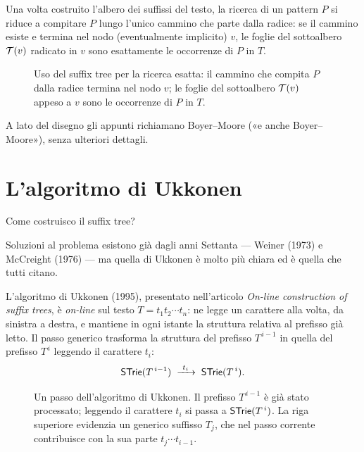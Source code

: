 Una volta costruito l'albero dei suffissi del testo, la ricerca di un pattern $P$ si riduce a
compitare $P$ lungo l'unico cammino che parte dalla radice: se il cammino esiste e termina
nel nodo (eventualmente implicito) $v$, le foglie del sottoalbero $\mathcal{T}(v)$ radicato in
$v$ sono esattamente le occorrenze di $P$ in $T$.

\begin{figure}[H]
\centering

\caption{Uso del suffix tree per la ricerca esatta: il cammino che compita $P$ dalla radice
termina nel nodo $v$; le foglie del sottoalbero $\mathcal{T}(v)$ appeso a $v$ sono le occorrenze
di $P$ in $T$.}
\label{fig:suffix-tree-ricerca-montagna}
\end{figure}

\begin{osservazione}
A lato del disegno gli appunti richiamano Boyer--Moore («e anche Boyer--Moore»), senza
ulteriori dettagli.
\end{osservazione}

\section{L'algoritmo di Ukkonen}

\begin{domanda}
Come costruisco il suffix tree?
\end{domanda}

\begin{osservazione}
Soluzioni al problema esistono già dagli anni Settanta --- Weiner (1973) e McCreight (1976)
--- ma quella di Ukkonen è molto più chiara ed è quella che tutti citano.
\end{osservazione}

L'algoritmo di Ukkonen (1995), presentato nell'articolo \emph{On-line construction of suffix
trees}, è \emph{on-line} sul testo $T = t_1 t_2 \cdots t_n$: ne legge un carattere alla volta,
da sinistra a destra, e mantiene in ogni istante la struttura relativa al prefisso già letto.
Il passo generico trasforma la struttura del prefisso $T^{\,i-1}$ in quella del prefisso
$T^{\,i}$ leggendo il carattere $t_i$:
\[
  \STrie{}(T^{\,i-1}) \;\xrightarrow{\ t_i\ }\; \STrie{}(T^{\,i}).
\]

\begin{figure}[H]
\centering

\caption{Un passo dell'algoritmo di Ukkonen. Il prefisso $T^{\,i-1}$ è già stato processato;
leggendo il carattere $t_i$ si passa a $\textsf{STrie}{}(T^{\,i})$. La riga superiore evidenzia un
generico suffisso $T_j$, che nel passo corrente contribuisce con la sua parte
$t_j \cdots t_{i-1}$.}
\label{fig:ukkonen-passo-prefissi}
\end{figure}

